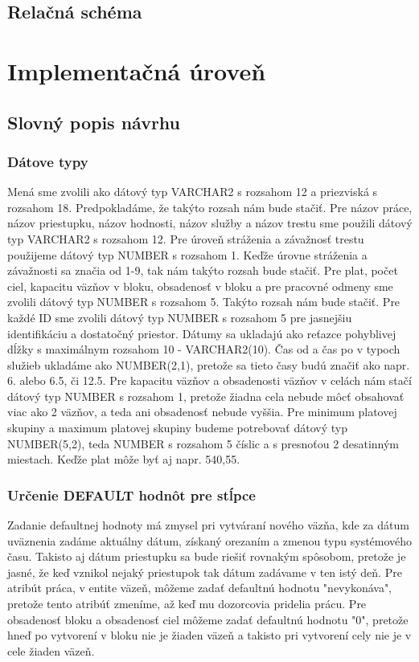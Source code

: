 \documentclass[slovak, 12pt, Times New Roman]{article}
\begin{document}
		\subsection{Relačná schéma}	
	\section{Implementačná úroveň}
		\subsection{Slovný popis návrhu}
			\subsubsection{Dátove typy}
				Mená sme zvolili ako dátový typ VARCHAR2 s rozsahom 12 a priezviská s rozsahom 18. Predpokladáme, že takýto rozsah nám bude 
				stačiť.
				Pre názov práce, názov priestupku, názov hodnosti, názov služby a názov trestu sme použili dátový typ VARCHAR2 s rozsahom 12. 
				Pre úroveň stráženia a závažnosť trestu použijeme dátový typ NUMBER s rozsahom 1. Keďže úrovne stráženia a závažnosti sa značia 
				od 1-9, tak nám takýto rozsah bude stačiť. 
				Pre plat, počet ciel, kapacitu väzňov v bloku, obsadenosť v bloku a pre pracovné odmeny sme zvolili dátový typ NUMBER s 
				rozsahom 5. Takýto rozsah nám bude stačiť.
				Pre každé ID sme zvolili dátový typ NUMBER s rozsahom 5 pre jasnejšiu identifikáciu a dostatočný priestor. 
				Dátumy sa ukladajú ako reťazce pohyblivej dĺžky s maximálnym rozsahom 10 - VARCHAR2(10).
				Čas od a čas po v typoch služieb ukladáme ako NUMBER(2,1), pretože sa tieto časy budú značiť ako napr. 6. alebo 6.5, či 12.5.
				Pre kapacitu väzňov a obsadenosti väzňov v celách nám stačí dátový typ NUMBER s rozsahom 1, pretože žiadna cela nebude môcť 
				obsahovať viac ako 2 väzňov, a teda ani obsadenosť nebude vyššia. 
				Pre minimum platovej skupiny a maximum platovej skupiny budeme potrebovať dátový typ NUMBER(5,2), teda NUMBER s rozsahom 5 
				číslic a s presnoťou 2 desatinným miestach. Keďže plat môže byť aj napr. 540,55.
			\subsubsection{Určenie DEFAULT hodnôt pre stĺpce}
				Zadanie defaultnej hodnoty má zmysel pri vytváraní nového väzňa, kde za dátum uväznenia zadáme aktuálny dátum, získaný orezaním 
				a zmenou typu systémového času. 
				Takisto aj dátum priestupku sa bude riešiť rovnakým spôsobom, pretože je jasné, že keď vznikol nejaký priestupok tak dátum 
				zadávame v ten istý deň. 
				Pre atribút práca, v entite väzeň, môžeme zadať defaultnú hodnotu "nevykonáva", pretože tento atribúť zmeníme, až keď mu 
				dozorcovia pridelia prácu. 
				Pre obsadenosť bloku a obsadenosť ciel môžeme zadať defaultnú hodnotu "0", pretože hneď po vytvorení v bloku nie je žiaden 
				väzeň a takisto pri vytvorení cely nie je v cele žiaden väzeň. 
\end{document}
